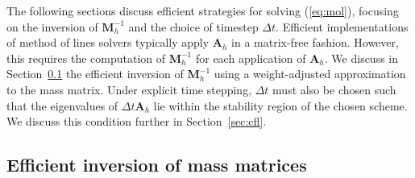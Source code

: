 \documentclass[preprint,10pt]{elsarticle}
\newcommand{\LRp}[1]{\left( #1 \right)}
\newcommand{\LRb}[1]{\left| #1 \right|}
\newcommand{\Grad} {\ensuremath{\nabla}}
\newcommand*\diff[1]{\mathop{}\!{\mathrm{d}#1}}
\begin{document}
The following sections discuss efficient strategies for solving (\ref{eq:mol}), focusing on the inversion of $\bm{M}_h^{-1}$ and the choice of timestep $\Delta t$.  Efficient implementations of method of lines solvers typically apply $\bm{A}_h$ in a matrix-free fashion.  However, this requires the computation of $\bm{M}_h^{-1}$ for each application of $\bm{A}_h$.  We discuss in Section~\ref{sec:wadg} the efficient inversion of $\bm{M}_h^{-1}$ using a weight-adjusted approximation to the mass matrix.  Under explicit time stepping, $\Delta t$ must also be chosen such that the eigenvalues of $\Delta t\bm{A}_h$ lie within the stability region of the chosen scheme.  %
We discuss this condition further in Section~\ref{sec:cfl}.  






\subsection{Efficient inversion of mass matrices}
\label{sec:wadg}
\end{document}
